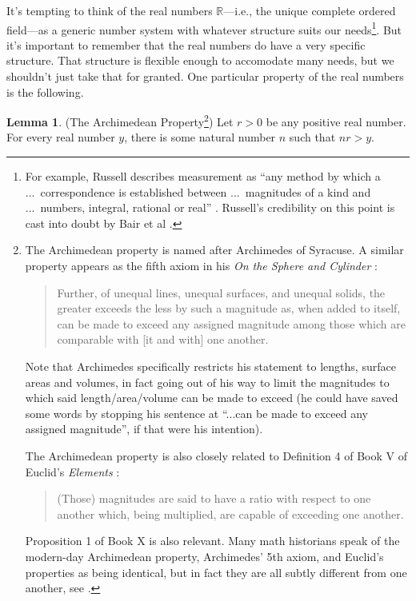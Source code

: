 \documentclass[reqno]{article}
\theoremstyle{definition}
\newtheorem{lemma}[theorem]{Lemma}
\begin{document}
It's tempting to think of the real numbers $\mathbb R$---i.e., the unique
complete ordered field---as a generic number system with whatever
structure suits our needs\footnote{For example, Russell describes
measurement as ``any method by which a ...\ correspondence
is established between ...\ magnitudes of a kind and ...\ numbers,
integral, rational or real'' \cite{russell1903principles}. Russell's
credibility on this point
is cast into doubt by Bair et al \cite{bair2013mathematical}.}. But it's
important to remember that the
real numbers do have a very specific structure. That structure is
flexible enough to accomodate many needs, but we shouldn't just
take that for granted. One particular property of the real numbers
is the following.

\begin{lemma}
\label{specializedarchimedeanlemma}
(The Archimedean Property\footnote{The Archimedean property is named after Archimedes of Syracuse.
A similar property appears as the fifth axiom in his \emph{On the Sphere
and Cylinder} \cite{archimedes}:
\begin{quote}
    Further, of unequal lines, unequal surfaces, and unequal
    solids, the greater exceeds the less by such a magnitude
    as, when added to itself, can be made to exceed any
    assigned magnitude among those which are comparable with
    [it and with] one another.
\end{quote}
Note that Archimedes specifically restricts his statement to
lengths, surface areas and volumes, in fact going out of his
way to limit the magnitudes to which said length/area/volume
can be made to exceed (he could have saved some words
by stopping his sentence at ``...can be made to exceed any
assigned magnitude'', if that were his intention).

The Archimedean property is also closely related to Definition 4 of Book V of Euclid's
\emph{Elements} \cite{euclid}:
\begin{quote}
    (Those) magnitudes are said to have a ratio
    with respect to one another which, being
    multiplied, are capable of exceeding one
    another.
\end{quote}
Proposition 1 of Book X is also relevant.
Many math historians
speak of the modern-day Archimedean property, Archimedes' 5th axiom, and Euclid's
properties as being identical, but in fact they are all subtly different from one
another, see \cite{bair2013mathematical}.})
Let $r>0$ be any positive real number.
For every real number $y$, there is some natural number $n$
such that $nr>y$.
\end{lemma}
\end{document}
